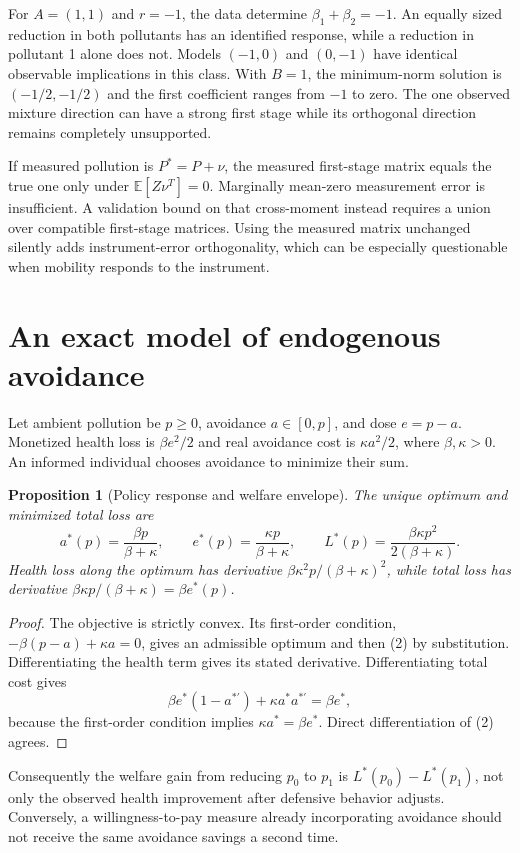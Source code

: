 \documentclass[11pt,a4paper]{article}
\newtheorem{proposition}[theorem]{Proposition}
\newcommand{\E}{\mathbb E}
\begin{document}
For $A=(1,1)$ and $r=-1$, the data determine $\beta_1+\beta_2=-1$. An equally sized reduction in both pollutants has an identified response, while a reduction in pollutant 1 alone does not. Models $(-1,0)$ and $(0,-1)$ have identical observable implications in this class. With $B=1$, the minimum-norm solution is $(-1/2,-1/2)$ and the first coefficient ranges from $-1$ to zero. The one observed mixture direction can have a strong first stage while its orthogonal direction remains completely unsupported.

If measured pollution is $P^*=P+\nu$, the measured first-stage matrix equals the true one only under $\E[Z\nu^T]=0$. Marginally mean-zero measurement error is insufficient. A validation bound on that cross-moment instead requires a union over compatible first-stage matrices. Using the measured matrix unchanged silently adds instrument-error orthogonality, which can be especially questionable when mobility responds to the instrument.

\section{An exact model of endogenous avoidance}
Let ambient pollution be $p\ge0$, avoidance $a\in[0,p]$, and dose $e=p-a$. Monetized health loss is $\beta e^2/2$ and real avoidance cost is $\kappa a^2/2$, where $\beta,\kappa>0$. An informed individual chooses avoidance to minimize their sum.
\begin{proposition}[Policy response and welfare envelope]
The unique optimum and minimized total loss are
\[
 a^*(p)=\frac{\beta p}{\beta+\kappa},\qquad
 e^*(p)=\frac{\kappa p}{\beta+\kappa},\qquad
 L^*(p)=\frac{\beta\kappa p^2}{2(\beta+\kappa)}. \tag{2}
\]
Health loss along the optimum has derivative $\beta\kappa^2p/(\beta+\kappa)^2$, while total loss has derivative $\beta\kappa p/(\beta+\kappa)=\beta e^*(p)$.
\end{proposition}
\begin{proof}
The objective is strictly convex. Its first-order condition, $-\beta(p-a)+\kappa a=0$, gives an admissible optimum and then (2) by substitution. Differentiating the health term gives its stated derivative. Differentiating total cost gives
\[
 \beta e^*(1-a^{*\prime})+\kappa a^*a^{*\prime}=\beta e^*,
\]
because the first-order condition implies $\kappa a^*=\beta e^*$. Direct differentiation of (2) agrees.
\end{proof}
Consequently the welfare gain from reducing $p_0$ to $p_1$ is $L^*(p_0)-L^*(p_1)$, not only the observed health improvement after defensive behavior adjusts. Conversely, a willingness-to-pay measure already incorporating avoidance should not receive the same avoidance savings a second time.
\end{document}
